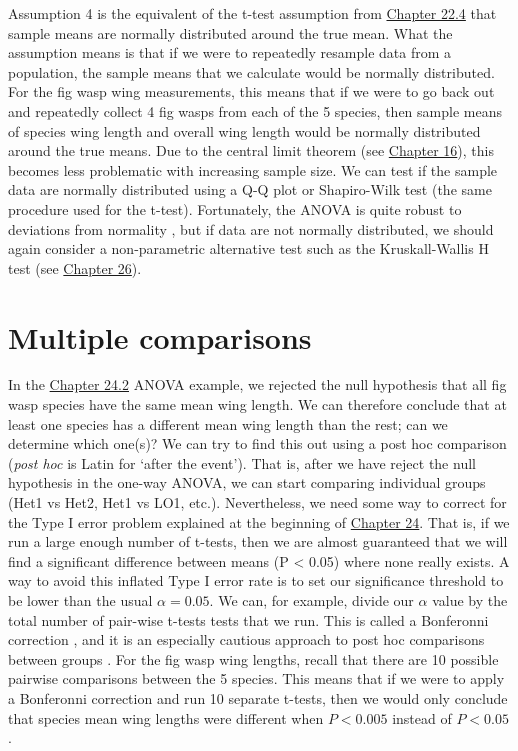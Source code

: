 \documentclass[
]{scrbook}
\begin{document}
Assumption 4 is the equivalent of the t-test assumption from \protect\hyperlink{assumptions-of-t-tests}{Chapter 22.4} that sample means are normally distributed around the true mean.
What the assumption means is that if we were to repeatedly resample data from a population, the sample means that we calculate would be normally distributed.
For the fig wasp wing measurements, this means that if we were to go back out and repeatedly collect 4 fig wasps from each of the 5 species, then sample means of species wing length and overall wing length would be normally distributed around the true means.
Due to the central limit theorem (see \protect\hyperlink{Chapter_16}{Chapter 16}), this becomes less problematic with increasing sample size.
We can test if the sample data are normally distributed using a Q-Q plot or Shapiro-Wilk test (the same procedure used for the t-test).
Fortunately, the ANOVA is quite robust to deviations from normality \citep{Schmider2010}, but if data are not normally distributed, we should again consider a non-parametric alternative test such as the Kruskall-Wallis H test (see \protect\hyperlink{Chapter_26}{Chapter 26}).

\hypertarget{Chapter_25}{%
\chapter{Multiple comparisons}\label{Chapter_25}}

In the \protect\hyperlink{one-way-anova}{Chapter 24.2} ANOVA example, we rejected the null hypothesis that all fig wasp species have the same mean wing length.
We can therefore conclude that at least one species has a different mean wing length than the rest; can we determine which one(s)?
We can try to find this out using a post hoc comparison (\emph{post hoc} is Latin for `after the event').
That is, after we have reject the null hypothesis in the one-way ANOVA, we can start comparing individual groups (Het1 vs Het2, Het1 vs LO1, etc.).
Nevertheless, we need some way to correct for the Type I error problem explained at the beginning of \protect\hyperlink{Chapter_24}{Chapter 24}.
That is, if we run a large enough number of t-tests, then we are almost guaranteed that we will find a significant difference between means (P \textless{} 0.05) where none really exists.
A way to avoid this inflated Type I error rate is to set our significance threshold to be lower than the usual \(\alpha = 0.05\).
We can, for example, divide our \(\alpha\) value by the total number of pair-wise t-tests tests that we run.
This is called a Bonferonni correction \citep{Dytham2011}, and it is an especially cautious approach to post hoc comparisons between groups \citep{Narum2006}.
For the fig wasp wing lengths, recall that there are 10 possible pairwise comparisons between the 5 species.
This means that if we were to apply a Bonferonni correction and run 10 separate t-tests, then we would only conclude that species mean wing lengths were different when \(P < 0.005\) instead of \(P < 0.05\).
\end{document}
